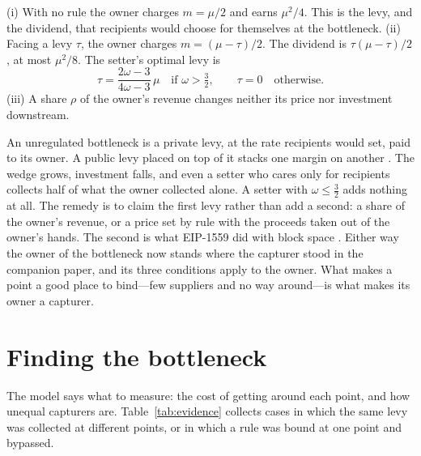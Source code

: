 \begin{proposition}\label{prop:owner}
(i) With no rule the owner charges $m=\mu/2$ and earns $\mu^2/4$. This is the levy, and
the dividend, that recipients would choose for themselves at the bottleneck. (ii) Facing
a levy $\tau$, the owner charges $m=(\mu-\tau)/2$. The dividend is
$\tau(\mu-\tau)/2$, at most $\mu^2/8$. The setter's optimal levy is
\begin{equation}
  \tau=\frac{2\omega-3}{4\omega-3}\,\mu \quad\text{if }\omega>\tfrac32,
  \qquad \tau=0\quad\text{otherwise}.
\end{equation}
(iii) A share $\rho$ of the owner's revenue changes neither its price nor investment
downstream.
\end{proposition}

An unregulated bottleneck is a private levy, at the rate recipients would set, paid to
its owner. A public levy placed on top of it stacks one margin on another
\citep{Spengler1950}. The wedge grows, investment falls, and even a setter who cares only
for recipients collects half of what the owner collected alone. A setter with
$\omega\le\frac32$ adds nothing at all. The remedy is to claim the first levy rather than
add a second: a share of the owner's revenue, or a price set by rule with the proceeds
taken out of the owner's hands. The second is what EIP-1559 did with block space
\citep{Buterin2019}. Either way the owner of the bottleneck now stands where the capturer
stood in the companion paper, and its three conditions apply to the owner. What makes a
point a good place to bind---few suppliers and no way around---is what makes its owner a
capturer.

\section{Finding the bottleneck}\label{sec:find}

The model says what to measure: the cost of getting around each point, and how unequal
capturers are. Table~\ref{tab:evidence} collects cases in which the same levy was
collected at different points, or in which a rule was bound at one point and bypassed.

